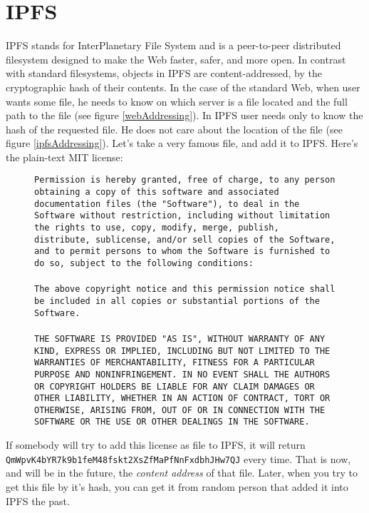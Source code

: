 \chapter{IPFS}

IPFS stands for InterPlanetary File System and is a peer-to-peer distributed filesystem designed to make the Web faster, safer, and more open. In contrast with standard filesystems, objects in IPFS are content-addressed, by the cryptographic hash of their contents. In the case of the standard Web, when user wants some file, he needs to know on which server is a file located and the full path to the file (see figure \ref{webAddressing}). In IPFS user needs only to know the hash of the requested file. He does not care about the location of the file (see figure \ref{ipfsAddressing}). Let’s take a very famous file, and add it to IPFS. Here’s the plain-text MIT license:

\begin{figure}[H]
    \texttt{Permission is hereby granted, free of charge, to any person obtaining a copy of this software and associated documentation files (the "Software"), to deal in the Software without restriction, including without limitation the rights to use, copy, modify, merge, publish, distribute, sublicense, and/or sell copies of the Software, and to permit persons to whom the Software is furnished to do so, subject to the following conditions:\\\\ The above copyright notice and this permission notice shall be included in all copies or substantial portions of the Software.\\\\ THE SOFTWARE IS PROVIDED "AS IS", WITHOUT WARRANTY OF ANY KIND, EXPRESS OR IMPLIED, INCLUDING BUT NOT LIMITED TO THE WARRANTIES OF MERCHANTABILITY, FITNESS FOR A PARTICULAR PURPOSE AND NONINFRINGEMENT. IN NO EVENT SHALL THE AUTHORS OR COPYRIGHT HOLDERS BE LIABLE FOR ANY CLAIM DAMAGES OR OTHER LIABILITY, WHETHER IN AN ACTION OF CONTRACT, TORT OR OTHERWISE, ARISING FROM, OUT OF OR IN CONNECTION WITH THE SOFTWARE OR THE USE OR OTHER DEALINGS IN THE SOFTWARE.}
\end{figure}

\noindent If somebody will try to add this license as file to IPFS, it will return \texttt{QmWpvK4bYR7k9b1feM48fsk\-t2XsZfMaPfNnFxdbhJHw7QJ} every time. That is now, and will be in the future, the \textit{content address} of that file. Later, when you try to get this file by it's hash, you can get it from random person that added it into IPFS the past.


